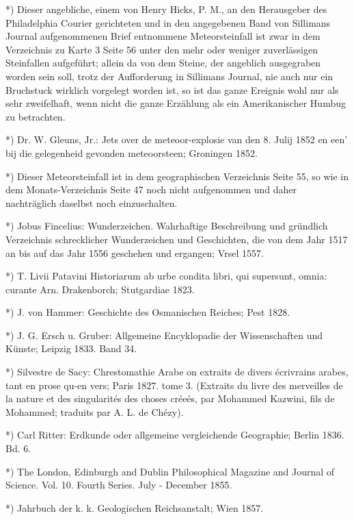 \documentclass[a4paper, 11pt, oneside, polutonikogreek, german]{article}
\begin{document}
*) Dieser angebliche, einem von Henry Hicks, P. M., an den Herausgeber des Philadelphia Courier gerichteten und in den angegebenen Band von Sillimans Journal aufgenommenen Brief entnommene Meteorsteinfall ist zwar in dem Verzeichnis zu Karte 3 Seite 56 unter den mehr oder weniger zuverlässigen Steinfallen aufgeführt; allein da von dem Steine, der angeblich ausgegraben worden sein soll, trotz der Aufforderung in Sillimans Journal, nie auch nur ein Bruchstuck wirklich vorgelegt worden ist, so ist das ganze Ereignis wohl nur als sehr zweifelhaft, wenn nicht die ganze Erzählung als ein Amerikanischer Humbug zu betrachten.

*) Dr. W. Gleuns, Jr.: Jets over de meteoor-explosie van den 8. Julij 1852 en een' bij die gelegenheid gevonden meteoorsteen; Groningen 1852.

*) Dieser Meteorsteinfall ist in dem geographischen Verzeichnis Seite 55, so wie in dem Monats-Verzeichnis Seite 47 noch nicht aufgenommen und daher nachträglich daselbst noch einzuschalten.

*) Jobus Fincelius: Wunderzeichen. Wahrhaftige Beschreibung und gründlich Verzeichnis schrecklicher Wunderzeichen und Geschichten, die von dem Jahr 1517 an bis auf das Jahr 1556 geschehen und ergangen; Vrsel 1557.

*) T. Livii Patavini Historiarum ab urbe condita libri, qui supersunt, omnia: curante Arn. Drakenborch; Stutgardiae 1823.

*) J. von Hammer: Geschichte des Osmanischen Reiches; Pest 1828.

*) J. G. Ersch u. Gruber: Allgemeine Encyklopadie der Wissenschaften und Künste; Leipzig 1833. Band 34.

*) Silvestre de Sacy: Chrestomathie Arabe on extraits de divers écrivrains arabes, tant en prose qu-en vers; Paris 1827. tome 3. (Extraits du livre des merveilles de la nature et des singularités des choses créeés, par Mohammed Kazwini, fils de Mohammed; traduits par A. L. de Chézy).

*) Carl Ritter: Erdkunde oder allgemeine vergleichende Geographie; Berlin 1836. Bd. 6.

*) The London, Edinburgh and Dublin Philosophical Magazine and Journal of Science. Vol. 10. Fourth Series. July - December 1855.

*) Jahrbuch der k. k. Geologischen Reichsanstalt; Wien 1857.
\clearpage
\end{document}
